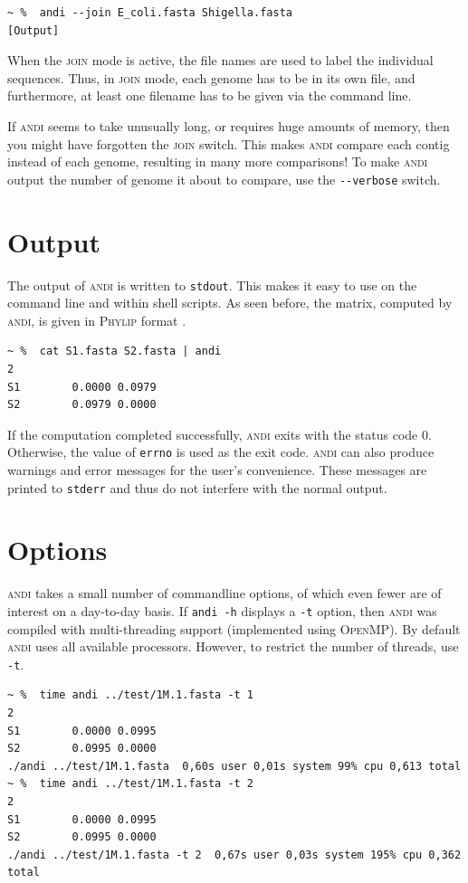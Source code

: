 \documentclass[a4paper,
  10pt,
  english,
  DIV=12,
  BCOR=8mm]{scrbook}
\newcommand{\algo}[1]{\textsc{{#1}}}
\newcommand{\andi}{\algo{andi}\xspace}
\begin{document}
\begin{lstlisting}
~ %  andi --join E_coli.fasta Shigella.fasta
[Output]
\end{lstlisting}

When the \algo{join} mode is active, the file names are used to label the individual sequences. Thus, in \algo{join} mode, each genome has to be in its own file, and furthermore, at least one filename has to be given via the command line.

If \andi seems to take unusually long, or requires huge amounts of memory, then you might have forgotten the \algo{join} switch. This makes \andi compare each contig instead of each genome, resulting in many more comparisons! To make \andi output the number of genome it about to compare, use the \lstinline$--verbose$ switch.

\section{Output}

The output of \andi is written to \lstinline$stdout$. This makes it easy to use on the command line and within shell scripts. As seen before, the matrix, computed by \algo{andi}, is given in \algo{Phylip} format \cite{phylip}.

\begin{lstlisting}
~ %  cat S1.fasta S2.fasta | andi
2
S1        0.0000 0.0979
S2        0.0979 0.0000
\end{lstlisting}

If the computation completed successfully, \andi exits with the status code 0. Otherwise, the value of \lstinline$errno$ is used as the exit code. \andi can also produce warnings and error messages for the user's convenience. These messages are printed to \lstinline$stderr$ and thus do not interfere with the normal output.

\section{Options} \label{sec:options}

\andi takes a small number of commandline options, of which even fewer are of interest on a day-to-day basis. If \lstinline$andi -h$ displays a \lstinline$-t$ option, then \andi was compiled with multi-threading support (implemented using \algo{OpenMP}). By default \andi uses all available processors. However, to restrict the number of threads, use \lstinline$-t$.

\begin{lstlisting}
~ %  time andi ../test/1M.1.fasta -t 1
2
S1        0.0000 0.0995
S2        0.0995 0.0000
./andi ../test/1M.1.fasta  0,60s user 0,01s system 99% cpu 0,613 total
~ %  time andi ../test/1M.1.fasta -t 2
2
S1        0.0000 0.0995
S2        0.0995 0.0000
./andi ../test/1M.1.fasta -t 2  0,67s user 0,03s system 195% cpu 0,362 total
\end{lstlisting}
\end{document}
